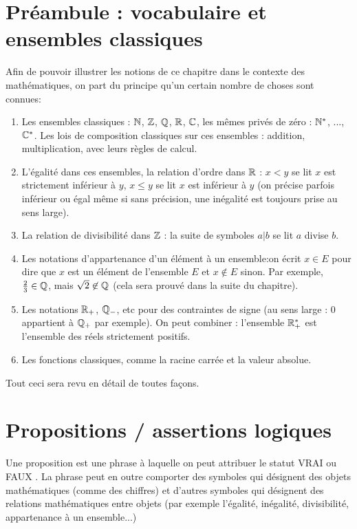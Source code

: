 
\section{Préambule : vocabulaire et ensembles classiques}
Afin de pouvoir illustrer les notions de ce chapitre dans le contexte des mathématiques, on part du principe qu'un certain nombre de choses sont connues:

\begin{enumerate}
\item Les ensembles classiques :  $\mathbb{N}$, $\mathbb{Z}$, $\mathbb{Q}$, $\mathbb{R}$, $\mathbb{C}$, les mêmes privés de zéro : $\mathbb{N}^*$, ..., $\mathbb{C}^*$. Les lois de composition classiques sur ces ensembles : addition, multiplication, avec leurs règles de calcul.
\item L'égalité dans ces ensembles, la relation d'ordre dans $\mathbb{R}$ : $x< y$ se lit \og$x$ est strictement inférieur à $y$\fg, $x\leq y$ se lit \og $x$ est inférieur à $y$\fg{} (on précise parfois \og inférieur ou égal\fg{} même si sans précision, une inégalité est toujours prise au sens large).
\item La relation de divisibilité dans $\mathbb{Z}$ : la suite de symboles $a|b$ se lit \og $a$ divise $b$\fg.
\item Les notations d'appartenance d'un élément à un ensemble:on écrit $x \in E$ pour dire que $x$ est un élément de l'ensemble $E$ et $x\not\in E$ sinon. Par exemple, $\frac23 \in \mathbb{Q}$, mais $\sqrt{2} \not\in\mathbb{Q}$ (cela sera prouvé dans la suite du chapitre). 
\item Les notations $\mathbb{R}_+$, $\mathbb{Q}_-$, etc pour des contraintes de signe (au sens large : $0$ appartient à $\mathbb{Q}_+$ par exemple). On peut combiner : l'ensemble $\mathbb{R}_+^*$ est l'ensemble des réels strictement positifs. 
\item Les fonctions classiques, comme la racine carrée et la valeur absolue.
\end{enumerate}

Tout ceci sera revu en détail de toutes façons.


\section{Propositions / assertions logiques}

\begin{definition}
Une proposition est une phrase à laquelle on peut attribuer le statut \og VRAI\fg{} ou \og FAUX \fg{}. La phrase peut en outre comporter des symboles qui désignent des objets mathématiques (comme des chiffres) et d'autres symboles qui désignent des relations mathématiques entre objets (par exemple l'égalité, inégalité, divisibilité, appartenance à un ensemble...)
\end{definition}

